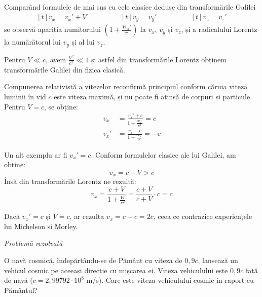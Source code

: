 \documentclass[a4paper, 12pt]{article}
\newcommand{\parbreak}{\vspace{1cm}}
\begin{document}
Comparând formulele de mai sus cu cele clasice deduse din transformările
Galilei
\begin{equation*}
    \begin{aligned}[t]
        v_x = v_x' + V
    \end{aligned}\qquad\qquad
    \begin{aligned}[t]
        v_y = v_y'
    \end{aligned}\qquad\qquad
    \begin{aligned}[t]
        v_z = v_z'
    \end{aligned}
\end{equation*}
se observă apariția numitorului \( \left( 1 + \frac{Vv_x'}{c^2} \right) \) la
$v_x$, $v_y$ și $v_z$, și a radicalului Lorentz la numărătorul lui $v_y$ și al
lui $v_z$.

Pentru \( V \ll c \), avem \( \frac{V^2}{c^2} \ll 1 \) și astfel din
transformările Lorentz obținem transformările Galilei din fizica clasică.

Compunerea relativistă a vitezelor reconfirmă principiul conform căruia viteza
luminii în vid $c$ este viteza maximă, și nu poate fi atinsă de corpuri și
particule. Pentru \( V = c \), se obține:
\begin{equation*}
    \begin{aligned}
        v_x &= \frac{v_x' + c}{1 + \frac{cv_x'}{c^2}} = c \\
        v_x' &= \frac{v_x - c}{1 - \frac{cv_x}{c^2}} = -c
    \end{aligned}
\end{equation*}

Un alt exemplu ar fi \( v_x' = c \). Conform formulelor clasice ale lui Galilei, am obține:
\[ v_x = c + V > c \]
Însă din transformările Lorentz ne rezultă:
\[ v_x = \frac{c + V}{1 + \frac{Vc}{c^2}} = \frac{c + V}{c + V} \cdot c = c \]

Dacă \( v_x' = c \) și \( V = c \), ar rezulta \( v_x = c + c = 2c \), ceea ce contrazice
experiențele lui Michelson și Morley.

\pagebreak

{\Large\emph{Problemă rezolvată}}
\vspace{0.5cm}

O navă cosmică, îndepărtându-se de Pământ cu viteza de $0,9c$, lansează un
vehicul cosmic pe aceeași direcție cu mișcarea ei. Viteza vehiculului este $0,9c$
față de navă ($c = 2,99792 \cdot 10^8$  m/s). Care este viteza vehiculului cosmic în
raport cu Pământul?

\parbreak
\end{document}
